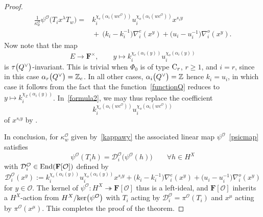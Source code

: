 \begin{proof}
\begin{align}
\frac{1}{\kappa_w^\mathcal{O}}\psi^\mathcal{O}\bigl(T_ix^\lambda T_w\bigr)
={}&k_i^{\chi_e(\alpha_i (wc^\mathcal{O} ))}u_i^{\chi_o(\alpha_i (wc^\mathcal{O} ))}x^{s_iy}\nonumber\\
&{}{+}\ \bigl(k_i-k_i^{-1}\bigr)\nabla_i^e(x^y)+\bigl(u_i-u_i^{-1}\bigr)\nabla_i^o(x^y).\label{formula2}
\end{align}
Now note that the map
\begin{equation}\label{functionQ}
E\rightarrow\mathbf{F}^\times,\qquad y\mapsto k_i^{\chi_e(\alpha_i(y))}u_i^{\chi_o(\alpha_i(y))}
\end{equation}
is $\tau\smash{\bigl(Q^\vee\bigr)}$-invariant. This is trivial when $\Phi_0$ is of type ${\rm C}_r$, $r\geq 1$, and $i=r$, since in this case $\alpha_r\smash{\bigl(Q^\vee\bigr)}=\mathbb{Z}_e$. In all other cases, $\alpha_i\smash{\bigl(Q^\vee\bigr)}=\mathbb{Z}$ hence $k_i=u_i$, in which case it follows from the fact that the function~\eqref{functionQ} reduces to $y\mapsto k_i^{\chi_{\mathbb{Z}}(\alpha_i(y))}$.
In~\eqref{formula2}, we may thus replace the coefficient
\[
k_i^{\chi_e(\alpha_i (wc^\mathcal{O} ))}u_i^{\chi_o(\alpha_i (wc^\mathcal{O} ))}
\] of $x^{s_iy}$ by
.

In conclusion, for $\kappa_w^\mathcal{O}$ given by~\eqref{kappawy} the associated linear map $\psi^\mathcal{O}$~\eqref{psicmap} satisfies
\[
\psi^\mathcal{O}(T_ih)=\mathcal{D}_i^\mathcal{O}\bigl(\psi^\mathcal{O}(h)\bigr)\qquad \forall h\in H^X
\]
with $\mathcal{D}_i^\mathcal{O}\in\textup{End}(\mathbf{F}[\mathcal{O}])$ defined by
\begin{equation*}
\mathcal{D}_i^\mathcal{O}(x^y):=k_i^{\chi_e(\alpha_i(y))}u_i^{\chi_o(\alpha_i(y))}x^{s_iy}+\bigl(k_i-k_i^{-1}\bigr)\nabla_i^e(x^y)+\bigl(u_i-u_i^{-1}\bigr)\nabla_i^o(x^y)
\end{equation*}
for $y\in\mathcal{O}$.
The kernel of $\psi^\mathcal{O}\colon H^X\twoheadrightarrow\mathbf{F}[\mathcal{O}]$ thus is a left-ideal, and $\mathbf{F}[\mathcal{O}]$ inherits a $H^X$-action from $H^X/\textup{ker}\bigl(\psi^\mathcal{O}\bigr)$ with $T_i$ acting by $\mathcal{D}_i^\mathcal{O}=\pi^\mathcal{O}(T_i)$ and $x^\mu$ acting by
$\pi^\mathcal{O}(x^\mu)$. This completes the proof of the theorem.
\end{proof}

